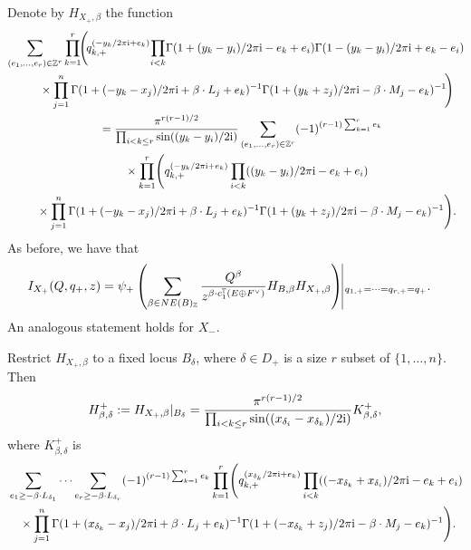 \documentclass[pdftex]{sigma}
\numberwithin{equation}{section}
\newcommand{\ZZ}{\mathbb{Z}}
\newcommand{\torus}{\mathbb{T}}
\newcommand{\F}{F}
\newcommand{\E}{E}
\newcommand{\MB}{M}
\newcommand{\LB}{L}
\newcommand{\z}{z}
\newcommand{\x}{x}
\newcommand{\y}{y}
\begin{document}
Denote by $H_{X_+, \beta}$ the function
\begin{gather*}
 \sum_{(e_1, \dots, e_r) \in \ZZ^r} \prod_{k=1}^r\! \Biggl(\!q_{k, +}^{(-\y_k/2\pi {\rm i} + e_k)}
\!\prod_{i < k}\! \Gamma(1 + (\y_k - \y_i)/2 \pi {\rm i} - e_k + e_i) \Gamma(1 - (\y_k - \y_i)/2 \pi {\rm i} + e_k - e_i)\! \\
\quad\quad{}\times \prod_{j=1}^n\Gamma(1+(-\y_k-\x_j)/2 \pi {\rm i}+\beta\cdot \LB_j+e_k)^{-1}\Gamma(1+(\y_k+\z_j)/2 \pi {\rm i}-\beta\cdot \MB_j-e_k)^{-1}\!\Biggr)
\\
\quad{} = \frac{\pi^{r(r-1)/2}}{\prod_{i<k\leq r} \sin((\y_k - \y_i)/2{\rm i})} \sum_{(e_1, \dots, e_r) \in \ZZ^r} (-1)^{(r-1) \sum_{k=1}^r e_k}
 \\
\qquad{} \times \prod_{k=1}^r \Biggl(q_{k, +}^{(-\y_k/2\pi {\rm i} + e_k)}
\prod_{i < k} ((\y_k - \y_i)/2 \pi {\rm i} - e_k + e_i)
 \\
\qquad{}\times \prod_{j=1}^n\Gamma(1+(-\y_k-\x_j)/2 \pi {\rm i}+\beta\cdot \LB_j+e_k)^{-1}\Gamma(1+(\y_k+\z_j)/2 \pi {\rm i}-\beta\cdot \MB_j-e_k)^{-1}\Biggr).
\end{gather*}
As before, we have that
\begin{align}\label{ItoH3} I_{X_+}(Q, q_+, z) &{}= \psi_+ \left( \sum_{\beta \in NE(B)_\ZZ} \frac{Q^\beta}{z^{\beta \cdot c_1^\torus(\E \oplus \F^\vee)}} H_{B, \beta} H_{X_+, \beta} \right)\vline_{q_{1, +} = \cdots =q_{r, +} = q_+}.
\end{align}
An analogous statement holds for $X_-$.

Restrict $H_{X_+, \beta}$ to a fixed locus $B_\delta$, where $\delta \in D_+$ is a size $r$ subset of $\{1, \dots, n\}$. Then
\begin{equation}\label{HBP}
 H^{+}_{\beta, \delta} := H_{X_+, \beta}|_{B_\delta} =
\frac{\pi^{r(r-1)/2}}{\prod_{i<k\leq r} \sin((\x_{\delta_i} - \x_{\delta_k})/2{\rm i})} K^{+}_{\beta, \delta},
\end{equation}
where $K^{+}_{\beta, \delta}$ is
\begin{align*}
&\sum_{e_1 \geq - \beta \cdot \LB_{\delta_1}} \cdots \sum _{e_r \geq - \beta \cdot \LB_{\delta_r}} (-1)^{(r-1) \sum_{k=1}^r e_k}\prod_{k=1}^r \Biggl(q_{k, +}^{( \x_{\delta_k}/2\pi {\rm i} + e_k)}
\prod_{i < k} ((- \x_{\delta_k} + \x_{\delta_i})/2 \pi {\rm i} - e_k + e_i)
 \\
& \quad{}\times \prod_{j=1}^n\Gamma (1+ (\x_{\delta_k}-\x_j )/2 \pi {\rm i}+\beta\cdot \LB_j+e_k )^{-1}\Gamma (1+ (-\x_{\delta_k}+\z_j )/2 \pi {\rm i}-\beta\cdot \MB_j-e_k )^{-1}\Biggr).
\end{align*}
\end{document}
